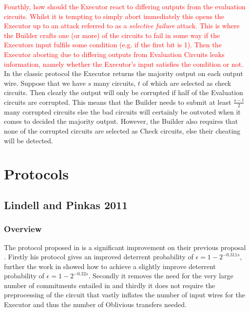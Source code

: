 \documentclass[ %
                    author={Nicholas Tutte},
                supervisor={Prof. Nigel Smart},
                    degree={MEng},
                     title={Secure Two Party Computation},
                  subtitle={A practical comparison of recent protocols},
                      type={Research - GG1K},
                      year={2015} ]{dissertation}
\begin{document}
				\textcolor{red}{Fourthly, how should the Executor react to differing outputs from the evaluation circuits. Whilst it is tempting to simply abort immediately this opens the Executor up to an attack referred to as a \emph{selective failure} attack. This is where the Builder crafts one (or more) of the circuits to fail in some way if the Executors input fulfils some condition (e.g. if the first bit is 1). Then the Executor aborting due to differing outputs from Evaluation Circuits leaks information, namely whether the Executor's input satisfies the condition or not.}\\

				In the classic protocol the Executor returns the majority output on each output wire. Suppose that we have $s$ many circuits, $t$ of which are selected as check circuits. Then clearly the output will only be corrupted if half of the Evaluation circuits are corrupted. This means that the Builder needs to submit at least $\frac{s - t}{2}$ many corrupted circuits else the bad circuits will certainly be outvoted when it comes to decided the majority output. However, the Builder also requires that none of the corrupted circuits are selected as Check circuits, else their cheating will be detected.



	\chapter{Protocols} \label{sec:Protocols}
		\section{Lindell and Pinkas 2011}
			\subsection*{Overview}
				The protocol proposed in \cite{LindellAndPinkas2011} is a significant improvement on their previous proposal \cite{LindellAndPinkas2007}. Firstly his protocol gives an improved deterrent probability of $\epsilon = 1 - 2^{-0.311s}$, further the work in \cite{ShelatAndShen} showed how to achieve a slightly improve deterrent probability of $\epsilon = 1 - 2^{-0.32s}$. Secondly it removes the need for the very large number of commitments entailed in \cite{LindellAndPinkas2007} and thirdly it does not require the preprocessing of the circuit that vastly inflates the number of input wires for the Executor and thus the number of Oblivious transfers needed.\\
\end{document}
